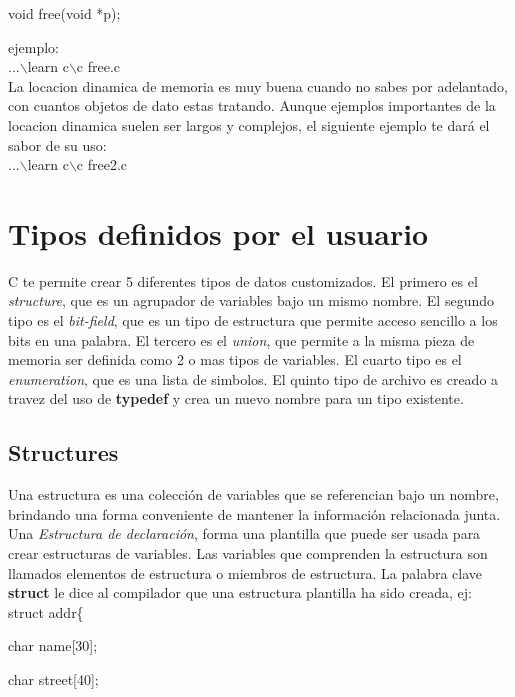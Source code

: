 \documentclass[]{article}
\begin{document}
	void free(void *p);
	
	ejemplo:\\
	
	...$\backslash$learn c$\backslash$c free.c\\
	
	La locacion dinamica de memoria es muy buena cuando no sabes por adelantado, con cuantos objetos de dato estas tratando. Aunque ejemplos importantes de la locacion dinamica suelen ser largos y complejos, el siguiente ejemplo te dará el sabor de su uso:\\
	
	...$\backslash$learn c$\backslash$c free2.c\\
	
	\section{Tipos definidos por el usuario}
	
		C te permite crear 5 diferentes tipos de datos customizados. El primero es el \textit{structure}, que es un agrupador de variables bajo un mismo nombre. El segundo tipo es el \textit{bit-field}, que es un tipo de estructura que permite acceso sencillo a los bits en una palabra. El tercero es el \textit{union}, que permite a la misma pieza de memoria ser definida como 2 o mas tipos de variables. El cuarto tipo es el \textit{enumeration}, que es una lista de simbolos. El quinto tipo de archivo es creado a travez del uso de \textbf{typedef} y crea un nuevo nombre para un tipo existente.
		
		\subsection{Structures}
		
			Una estructura es una colección de variables que se referencian bajo un nombre, brindando una forma conveniente de mantener la información relacionada junta. Una \textit{Estructura de declaración}, forma una plantilla que puede ser usada para crear estructuras de variables. Las variables que comprenden la estructura son llamados elementos de estructura o miembros de estructura. La palabra clave \textbf{struct} le dice al compilador que una estructura plantilla ha sido creada, ej:\\
			
			struct addr\{
			
			char name[30];
			
			char street[40];
			
\end{document}
